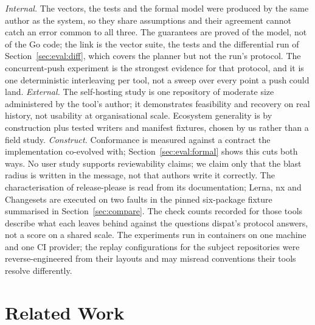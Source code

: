 \documentclass[10pt,conference]{IEEEtran}
\theoremstyle{definition}
\begin{document}
\emph{Internal.} The vectors, the tests and the formal model were
produced by the same author as the system, so they share assumptions
and their agreement cannot catch an error common to all three.
The guarantees are proved of the model, not of the Go code; the link
is the vector suite, the tests and the differential run of
Section~\ref{sec:eval:diff}, which covers the planner but not the
run's protocol. The concurrent-push experiment is the strongest
evidence for that protocol, and it is one deterministic interleaving
per tool, not a sweep over every point a push could land.
\emph{External.} The self-hosting study is one repository of moderate
size administered by the tool's author; it demonstrates feasibility
and recovery on real history, not usability at organisational scale.
Ecosystem generality is by construction plus tested writers and manifest
fixtures, chosen by us rather than a field study. \emph{Construct.}
Conformance is measured against a
contract the implementation co-evolved with;
Section~\ref{sec:eval:formal} shows this cuts both ways. No user study
supports reviewability claims; we claim only that the blast radius
is written in the message, not that authors write it correctly. The
characterisation of release-please is read from its documentation;
Lerna, nx and Changesets are executed on two faults in the pinned
six-package fixture summarised in Section~\ref{sec:compare}.
The check counts recorded for those tools describe what each leaves
behind against the questions dispat's protocol answers, not a score
on a shared scale. The experiments run in containers on one machine
and one CI provider; the replay configurations for the subject
repositories were reverse-engineered from their layouts and may
misread conventions their tools resolve differently.

\section{Related Work}
\label{sec:related}
\end{document}
